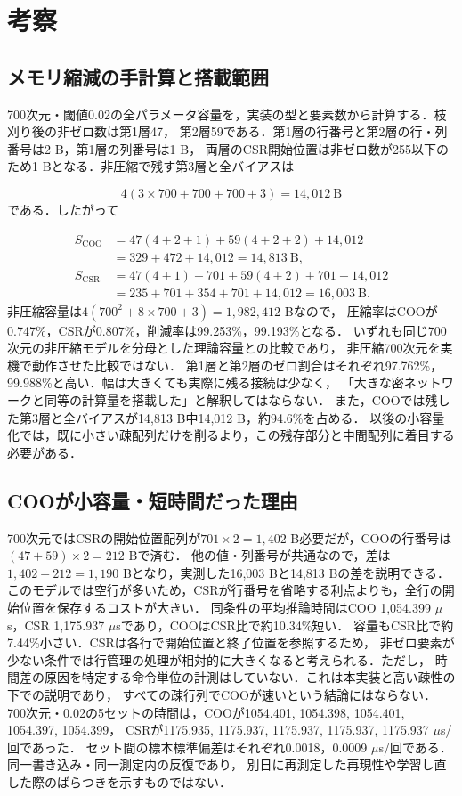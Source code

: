 \documentclass[a4paper,11pt]{article}
\begin{document}
\section{考察}
\subsection{メモリ縮減の手計算と搭載範囲}

700次元・閾値0.02の全パラメータ容量を，実装の型と要素数から計算する．枝刈り後の非ゼロ数は第1層47，
第2層59である．第1層の行番号と第2層の行・列番号は2 B，第1層の列番号は1 B，
両層のCSR開始位置は非ゼロ数が255以下のため1 Bとなる．非圧縮で残す第3層と全バイアスは

\[
    4(3\times700+700+700+3)=14,012\ \mathrm{B}
\]
%
である．したがって

\begin{align*}
    S_{\mathrm{COO}}&=47(4+2+1)+59(4+2+2)+14,012\\
    &=329+472+14,012=14,813\ \mathrm{B},\\
    S_{\mathrm{CSR}}&=47(4+1)+701+59(4+2)+701+14,012\\
    &=235+701+354+701+14,012=16,003\ \mathrm{B}.
\end{align*}
%
非圧縮容量は$4(700^2+8\times700+3)=1,982,412$ Bなので，
圧縮率はCOOが0.747\%，CSRが0.807\%，削減率は99.253\%，99.193\%となる．
いずれも同じ700次元の非圧縮モデルを分母とした理論容量との比較であり，
非圧縮700次元を実機で動作させた比較ではない．
第1層と第2層のゼロ割合はそれぞれ97.762\%，99.988\%と高い．幅は大きくても実際に残る接続は少なく，
「大きな密ネットワークと同等の計算量を搭載した」と解釈してはならない．
また，COOでは残した第3層と全バイアスが14,813 B中14,012 B，約94.6\%を占める．
以後の小容量化では，既に小さい疎配列だけを削るより，この残存部分と中間配列に着目する必要がある．

\subsection{COOが小容量・短時間だった理由}

700次元ではCSRの開始位置配列が$701\times2=1,402$ B必要だが，COOの行番号は$(47+59)\times2=212$ Bで済む．
他の値・列番号が共通なので，差は$1,402-212=1,190$ Bとなり，実測した16,003 Bと14,813 Bの差を説明できる．
このモデルでは空行が多いため，CSRが行番号を省略する利点よりも，全行の開始位置を保存するコストが大きい．
同条件の平均推論時間はCOO 1,054.399 $\mu$s，CSR 1,175.937 $\mu$sであり，COOはCSR比で約10.34\%短い．
容量もCSR比で約7.44\%小さい．CSRは各行で開始位置と終了位置を参照するため，
非ゼロ要素が少ない条件では行管理の処理が相対的に大きくなると考えられる．ただし，
時間差の原因を特定する命令単位の計測はしていない．これは本実装と高い疎性の下での説明であり，
すべての疎行列でCOOが速いという結論にはならない．
700次元・0.02の5セットの時間は，COOが1054.401, 1054.398, 1054.401, 1054.397, 1054.399，
CSRが1175.935, 1175.937, 1175.937, 1175.937, 1175.937 $\mu$s/回であった．
セット間の標本標準偏差はそれぞれ0.0018，0.0009 $\mu$s/回である．同一書き込み・同一測定内の反復であり，
別日に再測定した再現性や学習し直した際のばらつきを示すものではない．
\end{document}
